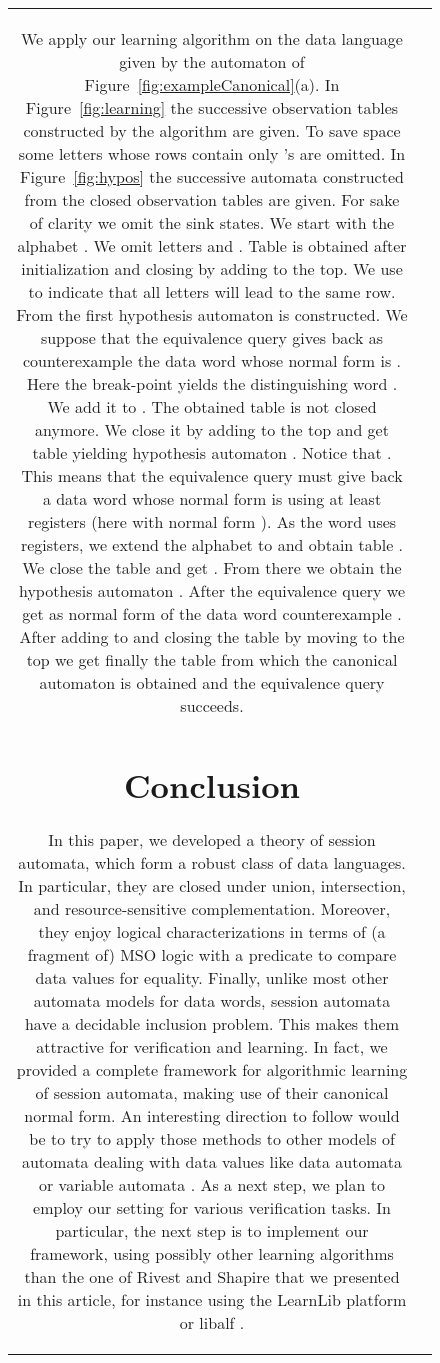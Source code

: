 \documentclass{LMCS}
\def\figurename{Figure}
\begin{document}
\begin{figure}[t]
\begin{tabular}{cc}
\begin{exa}
  We apply our learning algorithm on the data language given by the
  automaton  of
  \figurename~\ref{fig:exampleCanonical}(a).  In
  \figurename~\ref{fig:learning} the successive observation tables
  constructed by the algorithm are given. To save space some letters
  whose rows contain only 's are omitted.  In
  \figurename~\ref{fig:hypos} the successive automata constructed from
  the closed observation tables are given.  For sake of clarity we
  omit the sink states.  We start with the alphabet . We omit letters  and
  .  Table  is obtained after
  initialization and closing by adding  to the top.  We
  use  to indicate that all letters will lead to the same row.
  From  the first hypothesis automaton  is
  constructed.  We suppose that the equivalence query gives back as
  counterexample the data word  whose normal form is
  .  Here the break-point yields the
  distinguishing word .  We add it to . The obtained
  table is not closed anymore. We close it by adding 
  to the top and get table  yielding hypothesis
  automaton . Notice that .  This means that the equivalence
  query must give back a data word whose normal form is using at least
   registers (here  with normal form
  ).  As the word uses 
  registers, we extend the alphabet to  and
  obtain table .  We close the table and get .  From there we obtain the hypothesis automaton .  After
  the equivalence query we get
   as normal
  form of the data word counterexample . After
  adding  to  and closing the table by moving
   to the top we get finally
  the table  from which the canonical automaton
   is obtained and the equivalence query succeeds.
\end{exa}


\section{Conclusion}

In this paper, we developed a theory of session automata, which
form a robust class of data languages. In particular, they are closed under
union, intersection, and resource-sensitive complementation. Moreover, they
enjoy logical characterizations in terms of (a fragment of) MSO logic with
a predicate to compare data values for equality. Finally, unlike most other
automata models for data words, session automata have a decidable inclusion
problem. This makes them attractive for verification and learning.
In fact, we provided a complete framework for algorithmic learning of
session automata, making use of their canonical normal form. An
interesting direction to follow would be to try to apply those methods
to other models of automata dealing with data values like data
automata \cite{BojanczykDMSS11,Bjorklund10} or variable automata
\cite{DBLP:conf/lata/GrumbergKS10}.  As a next step, we plan to employ
our setting for various verification tasks. In particular, the next
step is to implement our framework, using possibly other learning
algorithms than the one of Rivest and Shapire that we presented in
this article, for instance using the LearnLib platform \cite{MRSL07}
or libalf \cite{BKKLNP10}.


\end{tabular}
\end{figure}
\end{document}
